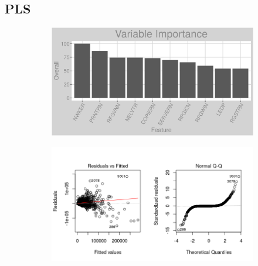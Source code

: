 \subsection{PLS}
\label{appendix:electricity:pls}
\begin{figure}[h]
\centering
\begin{subfigure}{1\textwidth}
\centering
\includegraphics[width=.99\textwidth, height=0.3\textheight]{Images/electricity_pls_vars.png}
\end{subfigure}
\begin{subfigure}{1\textwidth}
\centering
\includegraphics[width=.99\textwidth, height=0.475\textheight]{Images/electricity_pls_res_1.png}
\end{subfigure}
\end{figure}
\FloatBarrier
\newpage
